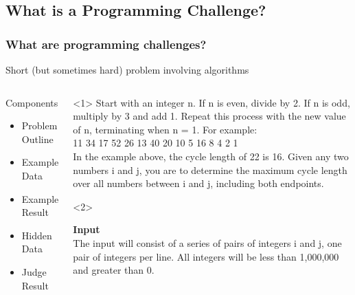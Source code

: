 \documentclass{beamer}
\begin{document}
\subsection{What is a Programming Challenge?}

\begin{frame}
  \frametitle{What are programming challenges?}
  \begin{center}
    Short (but sometimes hard) problem involving algorithms
  \end{center}

  \begin{columns}[c]
    \begin{block}{Components}
      \begin{itemize}
      \item \alert<1>{Problem Outline}
      \item \alert<2-3>{Example Data}
      \item \alert<2-3>{Example Result}
      \item \alert<4>{Hidden Data}
      \item \alert<5>{Judge Result}
      \end{itemize}
    \end{block}
    \begin{block}{}
      \begin{onlyenv}<1>
        {\small
        Start with an integer n. If n is even, divide by 2. If n is
        odd, multiply by 3 and add 1. Repeat this process with the new
        value of n, terminating when n = 1. For example:\\
         11 34 17 52 26 13 40 20 10 5 16 8 4 2 1\\
        \medskip
        In the example above, the cycle length of 22 is 16. Given any
        two numbers i and j, you are to determine the maximum cycle
        length over all numbers between i and j, including both
        endpoints.}
      \end{onlyenv}
      \begin{onlyenv}<2>
        {\small
        {\bf Input}\\        
        The input will consist of a series of pairs of integers i and
        j, one pair of integers per line. All integers will be less
        than 1,000,000 and greater than 0.\\
        \smallskip

}
\end{onlyenv}
\end{block}
\end{columns}
\end{frame}
\end{document}
